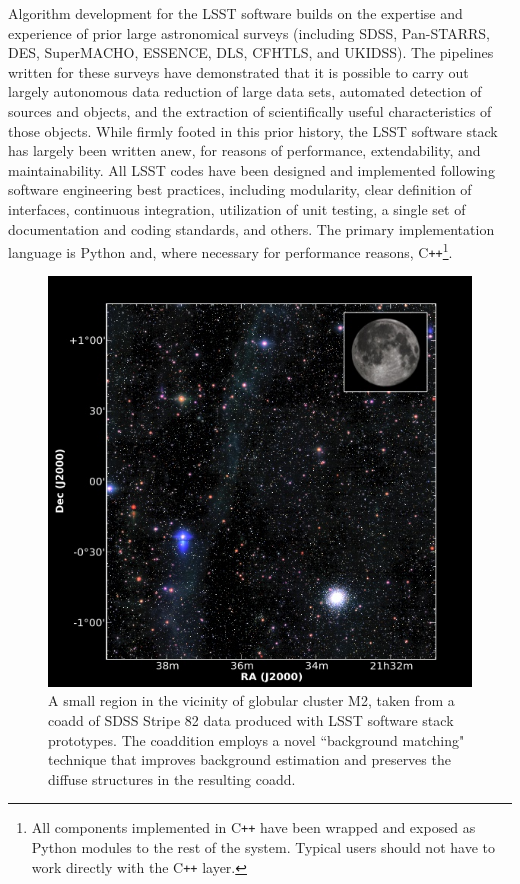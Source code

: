 Algorithm development for the LSST software builds on the expertise
and experience of prior large astronomical surveys (including SDSS,
Pan-STARRS, DES,
SuperMACHO, ESSENCE,  DLS, CFHTLS, and UKIDSS). The pipelines written
for these surveys have demonstrated that it is possible to carry out
largely autonomous data
reduction of large data sets, automated detection of sources and
objects, and the
extraction of scientifically useful characteristics of those objects.
While firmly footed in this prior history, the LSST software stack has
largely been written anew, for reasons of performance, extendability, and
maintainability. All LSST codes have been designed and implemented
following software engineering best practices, including modularity, clear definition
of interfaces, continuous integration,
utilization of unit testing, a single set of documentation and coding
standards, and others. The primary implementation language is Python and, where
necessary for performance reasons, C\texttt{++}\footnote{All components implemented
in C\texttt{++} have been wrapped and exposed as Python modules to the rest of the system.
Typical users should not have to work directly with the C\texttt{++} layer.}.

\begin{figure}
%
%
\includegraphics[width=1.0\hsize,clip]{DMStripe82.jpg}
\caption{
A small region in the vicinity of globular cluster M2, taken from a coadd of SDSS Stripe 82 data produced with LSST software stack prototypes. The coaddition employs a novel ``background matching" technique that improves background estimation and preserves the diffuse structures in the resulting coadd.}
\label{Fig:DMStripe82}
\end{figure}


